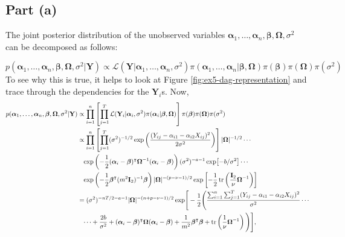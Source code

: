 \documentclass[
]{homework}
\begin{document}
\subsection{Part (a)}\label{part-a-4}

The joint posterior distribution of the unobserved variables \(\boldsymbol\alpha_1, \ldots, \boldsymbol\alpha_n, \boldsymbol\beta, \boldsymbol\Omega, \sigma^2\) can be decomposed as follows:

\[
p(\boldsymbol\alpha_1, \ldots, \boldsymbol\alpha_n, \boldsymbol\beta, \boldsymbol\Omega, \sigma^2 | \mathbf Y)
\propto \mathcal L(\mathbf Y | \boldsymbol\alpha_1, \ldots, \boldsymbol\alpha_n, \sigma^2) \pi(\boldsymbol\alpha_1, \ldots, \boldsymbol\alpha_n | \boldsymbol\beta, \boldsymbol\Omega) \pi(\boldsymbol\beta)\pi(\boldsymbol\Omega)\pi(\sigma^2)
\]
To see why this is true, it helps to look at Figure \ref{fig:ex5-dag-representation} and trace through the dependencies for the \(\mathbf Y_i\)s. Now,
\begin{align*}
p(\boldsymbol\alpha_1, \ldots, \boldsymbol\alpha_n, \boldsymbol\beta, \boldsymbol\Omega, \sigma^2 | \mathbf Y)
&\propto \prod_{i = 1}^n \left[ \prod_{j = 1}^T \mathcal L(\mathbf Y_i | \boldsymbol\alpha_i, \sigma^2) \pi(\boldsymbol\alpha_i | \boldsymbol\beta, \boldsymbol\Omega) \right] \pi(\boldsymbol\beta) \pi(\boldsymbol\Omega) \pi(\sigma^2) \\
&\propto \prod_{i = 1}^n \left[\prod_{j = 1}^T (\sigma^2)^{-1/2} \exp\left(\frac{(Y_{ij} - \alpha_{i1} - \alpha_{i2}X_{ij})^2}{2\sigma^2}\right)\right] |\boldsymbol\Omega|^{-1/2} \cdots \\
&\hphantom{\propto} \exp\left(- \frac{1}{2} (\boldsymbol\alpha_i - \boldsymbol\beta)^\intercal \boldsymbol\Omega^{-1} (\boldsymbol\alpha_i - \boldsymbol\beta)\right) (\sigma^2)^{- a - 1} \exp[-b/\sigma^2] \cdots \\
&\hphantom{\propto} \exp\left(- \frac{1}{2} \boldsymbol\beta^\intercal (m^2 \mathbf I_2)^{-1} \boldsymbol\beta\right) |\boldsymbol\Omega|^{-(p - \nu - 1)/2} \exp \left[- \frac{1}{2} \tr\left(\frac{\mathbf I_2}{\nu} \boldsymbol\Omega^{-1}\right)\right] \\
&= (\sigma^2)^{-nT/2 - a - 1} |\boldsymbol\Omega|^{-(n + p - \nu - 1)/2} \exp\Biggr[- \frac{1}{2} \Biggl(\frac{\sum_{i = 1}^n \sum_{j = 1}^T (Y_{ij} - \alpha_{i1} - \alpha_{i2} X_{ij})^2}{\sigma^2}\cdots \\
&\hphantom{=} \cdots + \frac{2b}{\sigma^2} + (\boldsymbol\alpha_i - \boldsymbol\beta)^\intercal \boldsymbol\Omega(\boldsymbol\alpha_i - \boldsymbol\beta) + \frac{1}{m^2} \boldsymbol\beta^\intercal \boldsymbol\beta + \tr\left(\frac{1}{\nu} \boldsymbol\Omega^{-1} \right)\Biggl)\Biggr],
\end{align*}
\end{document}
